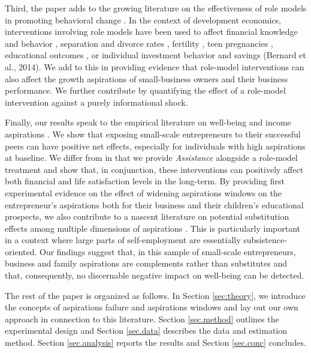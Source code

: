 \documentclass[11.5pt]{article}
\begin{document}
Third, the paper adds to the growing literature on the effectiveness of role models in promoting behavioral change \citep[see, e.g.,][]{Berg2017, Beaman2012, Ferrara2012, Chong2009, Kearney2015, Bernard2014, Riley2017}. %
In the context of development economics, interventions involving role models have been used to affect financial knowledge and behavior \citep{Berg2017}, separation and divorce rates \citep{Chong2009}, fertility \citep{Ferrara2012}, teen pregnancies \citep{Kearney2015}, educational outcomes \citep{Beaman2012, Riley2017}, or individual investment behavior and savings (Bernard et al., 2014). We add to this in providing evidence that role-model interventions can also affect the growth aspirations of small-business owners and their business performance. We further contribute by quantifying the effect of a role-model intervention against a purely informational shock.

Finally, our results speak to the empirical literature on well-being and income aspirations \citep[e.g.,][]{Easterlin1995, Easterlin2001, Easterlin2003, Clark2008, Frey2002}. We show that exposing small-scale entrepreneurs to their successful peers can have positive net effects, especially for individuals with high aspirations at baseline. We differ from \citet{Bernard2014} in that we provide \emph{Assistance} alongside a role-model treatment and show that, in conjunction, these interventions can positively affect both financial and life satisfaction levels in the long-term. By providing first experimental evidence on the effect of widening aspirations windows on the entrepreneur's aspirations both for their business and their children's educational prospects, we also contribute to a nascent literature on potential substitution effects among multiple dimensions of aspirations \citep[see, e.g.,][]{Bernard2014, Bjorvatn2015}. This is particularly important in a context where large parts of self-employment are essentially subsistence-oriented. Our findings suggest that, in this sample of small-scale entrepreneurs, business and family aspirations are complements rather than substitutes and that, consequently, no discernable negative impact on well-being can be detected.

The rest of the paper is organized as follows. In Section \ref{sec:theory}, we introduce the concepts of aspirations failure and aspirations windows and lay out our own approach in connection to this literature. Section \ref{sec.method} outlines the experimental design and Section \ref{sec.data} describes the data and estimation method. Section \ref{sec.analysis} reports the results and Section \ref{sec.conc} concludes.
\end{document}

